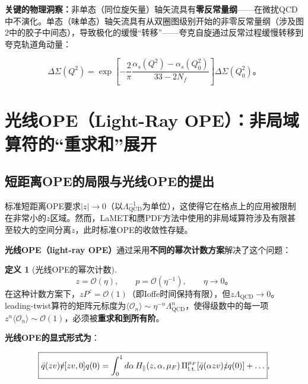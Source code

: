 \documentclass[12pt,a4paper]{ctexart}
\theoremstyle{definition}
\newtheorem{definition}{定义}[section]
\begin{document}
\textbf{关键的物理洞察：}非单态（同位旋矢量）轴矢流具有\textbf{零反常量纲}——在微扰QCD中不演化。单态（味单态）轴矢流具有从双圈图级别开始的非零反常量纲（涉及图2中的胶子中间态），导致极化的缓慢``转移''——夸克自旋通过反常过程缓慢转移到夸克轨道角动量\cite{JaffeManohar1990}：

\begin{equation}
\Delta\Sigma(Q^2) = \exp\left[ -\frac{2}{\pi}\frac{\alpha_s(Q^2) - \alpha_s(Q_0^2)}{33 - 2N_f} \right] \Delta\Sigma(Q_0^2)。
\label{eq:singlet_evolution}
\end{equation}

\section{光线OPE（Light-Ray OPE）：非局域算符的``重求和''展开}

\subsection{短距离OPE的局限与光线OPE的提出}

标准短距离OPE要求$|z| \to 0$（以$\Lambda_{\text{QCD}}^{-1}$为单位），这使得它在格点上的应用被限制在非常小的$z$区域。然而，LaMET和赝PDF方法中使用的非局域算符涉及有限甚至较大的空间分离$z$，此时标准OPE的收敛性存疑。

\textbf{光线OPE（light-ray OPE）}\cite{Braun2019power}通过采用\textbf{不同的幂次计数方案}解决了这个问题：

\begin{definition}[光线OPE的幂次计数]\cite{Braun2019power}
\begin{equation}
\boxed{z = \mathcal{O}(\eta), \qquad p = \mathcal{O}(\eta^{-1}), \qquad \eta \to 0}。
\label{eq:light_ray_power_counting}
\end{equation}
在这种计数方案下，$zP^z = \mathcal{O}(1)$（即Ioffe时间保持有限），但$z\Lambda_{\text{QCD}} \to 0$。leading-twist算符的矩阵元标度为$\langle\mathcal{O}_n\rangle \sim \eta^{-n}\Lambda_{\text{QCD}}^n$，使得级数中的每一项$z^n \langle\mathcal{O}_n\rangle \sim \mathcal{O}(1)$，必须被\textbf{重求和到所有阶}。
\end{definition}

\textbf{光线OPE的显式形式为}\cite{Braun2019power}：

\begin{equation}
\boxed{\bar{q}(zv)\slashed{v}[zv,0]q(0) = \int_0^1 d\alpha\, H_\parallel(z, \alpha, \mu_F) \, \Pi^{\mu_F}_{\text{l.t.}}[\bar{q}(\alpha zv)\slashed{z}q(0)] + \ldots},
\label{eq:light_ray_OPE}
\end{equation}
\end{document}
